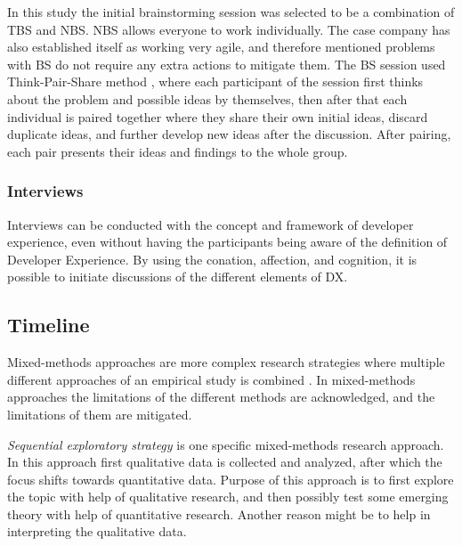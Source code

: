 \documentclass[english, 12pt, a4paper, sci, utf8, a-1b, online]{aaltothesis}
\begin{document}
In this study the initial brainstorming session was selected to be a combination of TBS and NBS. NBS allows everyone to work individually. The case company has also established itself as working very agile, and therefore mentioned problems with BS do not require any extra actions to mitigate them. The BS session used Think-Pair-Share method \citep{think-pair-share}, where each participant of the session first thinks about the problem and possible ideas by themselves, then after that each individual is paired together where they share their own initial ideas, discard duplicate ideas, and further develop new ideas after the discussion. After pairing, each pair presents their ideas and findings to the whole group.

\subsubsection{Interviews}

Interviews can be conducted with the concept and framework of developer experience, even without having the participants being aware of the definition of Developer Experience. By using the conation, affection, and cognition, it is possible to initiate discussions of the different elements of DX.


\subsection{Timeline}

Mixed-methods approaches are more complex research strategies where multiple different approaches of an empirical study is combined \citep{easterbrook2008selecting}. In mixed-methods approaches the limitations of the different methods are acknowledged, and the limitations of them are mitigated.

\textit{Sequential exploratory strategy} is one specific mixed-methods research approach. In this approach first qualitative data is collected and analyzed, after which the focus shifts towards quantitative data. Purpose of this approach is to first explore the topic with help of qualitative research, and then possibly test some emerging theory with help of quantitative research. Another reason might be to help in interpreting the qualitative data.
\end{document}
